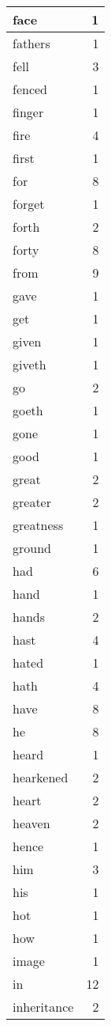 \begin{center}
\begin{longtable}{l|r}
face & 1 \\ \hline
fathers & 1 \\ \hline
fell & 3 \\ \hline
fenced & 1 \\ \hline
finger & 1 \\ \hline
fire & 4 \\ \hline
first & 1 \\ \hline
for & 8 \\ \hline
forget & 1 \\ \hline
forth & 2 \\ \hline
forty & 8 \\ \hline
from & 9 \\ \hline
gave & 1 \\ \hline
get & 1 \\ \hline
given & 1 \\ \hline
giveth & 1 \\ \hline
go & 2 \\ \hline
goeth & 1 \\ \hline
gone & 1 \\ \hline
good & 1 \\ \hline
great & 2 \\ \hline
greater & 2 \\ \hline
greatness & 1 \\ \hline
ground & 1 \\ \hline
had & 6 \\ \hline
hand & 1 \\ \hline
hands & 2 \\ \hline
hast & 4 \\ \hline
hated & 1 \\ \hline
hath & 4 \\ \hline
have & 8 \\ \hline
he & 8 \\ \hline
heard & 1 \\ \hline
hearkened & 2 \\ \hline
heart & 2 \\ \hline
heaven & 2 \\ \hline
hence & 1 \\ \hline
him & 3 \\ \hline
his & 1 \\ \hline
hot & 1 \\ \hline
how & 1 \\ \hline
image & 1 \\ \hline
in & 12 \\ \hline
inheritance & 2 \\ \hline

\end{longtable}
\end{center}
